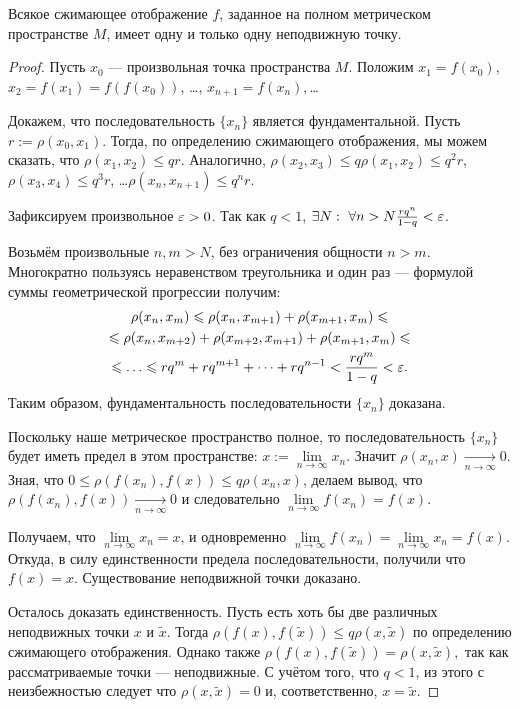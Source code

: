 \begin{Theorem}
  Всякое сжимающее отображение $f$, заданное на полном метрическом пространстве $M$, имеет одну и только одну неподвижную точку.
\end{Theorem}
\begin{proof}

Пусть $x_0$ --- произвольная точка пространства $M$. Положим $x_1 = f(x_0) $, $x_2 = f(x_1) = f(f(x_0))$, \dots, $x_{n+1} = f(x_{n}),$\dots

Докажем, что последовательность  $\{ x_n \} $ является фундаментальной.
Пусть $r := \rho(x_0, x_1)$.  Тогда, по определению сжимающего отображения, мы можем сказать, что  $\rho(x_1, x_2) \leq qr$. Аналогично, $\rho(x_2, x_3) \leq q \rho(x_1, x_2) \leq q^2r $, $\rho(x_3, x_4) \leq q^3r $, \dots  $\rho(x_{n}, x_{n+1}) \leq q^nr$.

Зафиксируем произвольное $\varepsilon>0$. 
Так как  $q < 1 $, $\exists N:\ \forall n>N \frac{rq^n}{1-q} < \varepsilon$.

Возьмём произвольные $n, m >N$, без ограничения общности $n>m$.
Многократно пользуясь неравенством треугольника и один раз --- формулой суммы геометрической прогрессии получим:
\begin{multline}\rho(x_n, x_m) \leq \rho(x_n, x_{m+1})+\rho(x_{m+1}, x_m)\leq\\ \leq \rho(x_n, x_{m+2})+ \rho(x_{m+2}, x_{m+1})+\rho(x_{m+1}, x_m) \leq\\\leq \dots\leq rq^{m} + rq^{m+1}+\dots+rq^{n-1} < \frac{rq^m}{1-q} < \eps .\end{multline}	
Таким образом, фундаментальность последовательности  $\{ x_n \} $ доказана. 


Поскольку наше метрическое пространство полное, то последовательность $\{ x_n \}$ будет иметь предел в этом пространстве: $x:= \lim\limits_{n \to \infty}x_n$.
Значит $\rho(x_{n}, x) \xrightarrow[n \to\infty]{} 0$. Зная, что $0\leq\rho(f(x_{n}), f(x))\leq q \rho(x_{n}, x)$, делаем вывод, что $\rho(f(x_{n}), f(x)) \xrightarrow[n \to\infty]{} 0$ и следовательно $\lim\limits_{n \to \infty}f(x_n) = f(x)$.

Получаем, что  $\lim\limits_{n \to \infty}x_n = x$, и одновременно $\lim\limits_{n \to \infty}f(x_n) = \lim\limits_{n \to \infty}x_n= f(x)$. Откуда, в силу единственности предела последовательности, получили что $f(x) = x$.
Существование неподвижной точки доказано.


Осталось доказать единственность. 
Пусть есть хоть бы две различных неподвижных точки $x$ и $\tilde{x}$.
Тогда $\rho(f(x), f(\tilde{x})) \leq q\rho(x, \tilde{x})$ по определению сжимающего отображения. Однако также $\rho(f(x), f(\tilde{x})) = \rho(x, \tilde{x}),$ так как рассматриваемые точки --- неподвижные. С учётом того, что $q<1$, из этого с неизбежностью следует что $\rho(x, \tilde{x}) = 0$ и, соответственно, $x = \tilde{x}$.

\end{proof}

